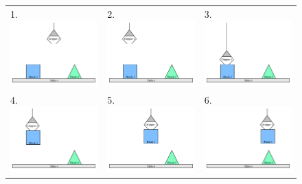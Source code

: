 \begin{figure}
\begin{center}
\begin{tabular}{p{4cm}p{4cm}p{4cm}}
1. \includegraphics[width=4cm]{gfx/blocks_world_example-1}  & 2. \includegraphics[width=4cm]{gfx/blocks_world_example-2}  & 3. \includegraphics[width=4cm]{gfx/blocks_world_example-3} \\
4. \includegraphics[width=4cm]{gfx/blocks_world_example-4}  & 5. \includegraphics[width=4cm]{gfx/blocks_world_example-5}  & 6. \includegraphics[width=4cm]{gfx/blocks_world_example-6} \\

\end{tabular}
\end{center}
\end{figure}
